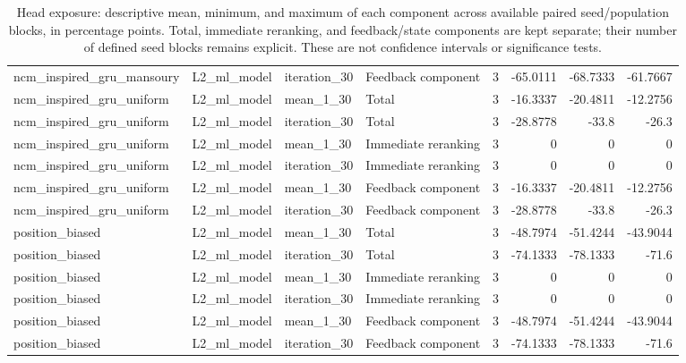 \begin{table}[htbp!]
\begin{tabular}{llllrrrr}
ncm\_inspired\_gru\_mansoury & L2\_ml\_model & iteration\_30 & Feedback component & 3 & -65.0111 & -68.7333 & -61.7667 \\
ncm\_inspired\_gru\_uniform & L2\_ml\_model & mean\_1\_30 & Total & 3 & -16.3337 & -20.4811 & -12.2756 \\
ncm\_inspired\_gru\_uniform & L2\_ml\_model & iteration\_30 & Total & 3 & -28.8778 & -33.8 & -26.3 \\
ncm\_inspired\_gru\_uniform & L2\_ml\_model & mean\_1\_30 & Immediate reranking & 3 & 0 & 0 & 0 \\
ncm\_inspired\_gru\_uniform & L2\_ml\_model & iteration\_30 & Immediate reranking & 3 & 0 & 0 & 0 \\
ncm\_inspired\_gru\_uniform & L2\_ml\_model & mean\_1\_30 & Feedback component & 3 & -16.3337 & -20.4811 & -12.2756 \\
ncm\_inspired\_gru\_uniform & L2\_ml\_model & iteration\_30 & Feedback component & 3 & -28.8778 & -33.8 & -26.3 \\
position\_biased & L2\_ml\_model & mean\_1\_30 & Total & 3 & -48.7974 & -51.4244 & -43.9044 \\
position\_biased & L2\_ml\_model & iteration\_30 & Total & 3 & -74.1333 & -78.1333 & -71.6 \\
position\_biased & L2\_ml\_model & mean\_1\_30 & Immediate reranking & 3 & 0 & 0 & 0 \\
position\_biased & L2\_ml\_model & iteration\_30 & Immediate reranking & 3 & 0 & 0 & 0 \\
position\_biased & L2\_ml\_model & mean\_1\_30 & Feedback component & 3 & -48.7974 & -51.4244 & -43.9044 \\
position\_biased & L2\_ml\_model & iteration\_30 & Feedback component & 3 & -74.1333 & -78.1333 & -71.6 \\
\hline
\end{tabular}
\caption{Head exposure: descriptive mean, minimum, and maximum of each component across available paired seed/population blocks, in percentage points. Total, immediate reranking, and feedback/state components are kept separate; their number of defined seed blocks remains explicit. These are not confidence intervals or significance tests.}
\label{chap:results:tab:rq4_post_processing_head_exposure_component_seed_consistency}
\end{table}
